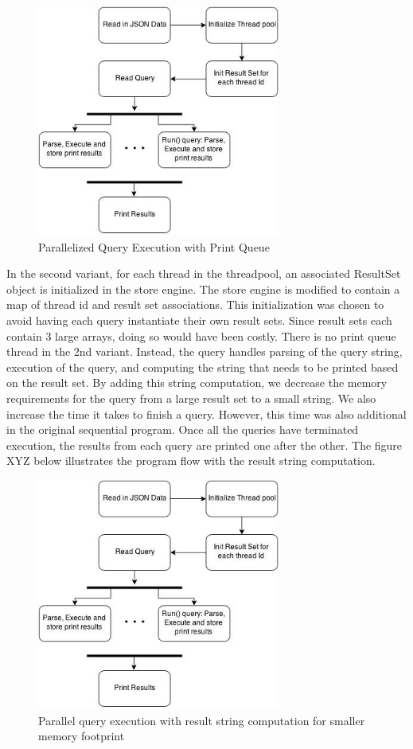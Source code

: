 \documentclass[11pt,journal,compsoc]{IEEEtran}
\begin{document}
\begin{figure}
\includegraphics[height=3in]{images/query_parallel}
\caption{Parallelized Query Execution with Print Queue}
\label{fig_parallel_query}
\end{figure}

In the second variant, for each thread in the threadpool, an associated ResultSet object is initialized in the store engine. The store engine is modified to contain a map of thread id and result set associations. This initialization was chosen to avoid having each query instantiate their own result sets. Since result sets each contain 3 large arrays, doing so would have been costly. There is no print queue thread in the 2nd variant. Instead, the query handles parsing of the query string, execution of the query, and computing the string that needs to be printed based on the result set. By adding this string computation, we decrease the memory requirements for the query from a large result set to a small string. We also increase the time it takes to finish a query. However, this time was also additional in the original sequential program. Once all the queries have terminated execution, the results from each query are printed one after the other. The figure XYZ below illustrates the program flow with the result string computation.

\begin{figure}
\includegraphics[height=3in]{images/query_parallel}
\caption{Parallel query execution with result string computation for smaller memory footprint}
\label{fig_parallel_query}
\end{figure}
\end{document}
